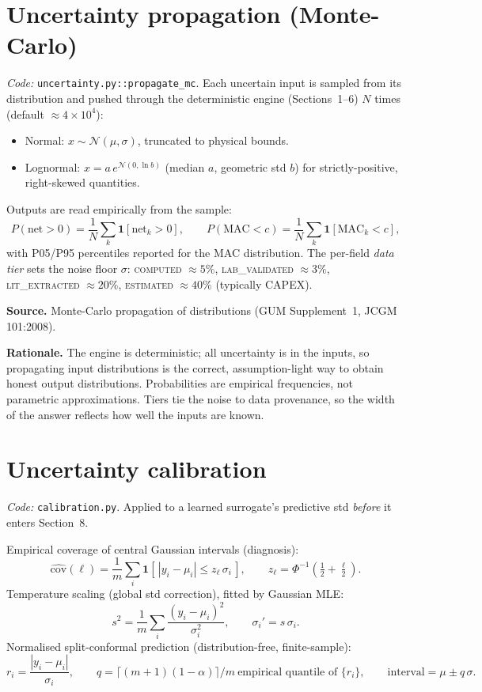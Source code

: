 \documentclass[11pt,a4paper]{article}
\begin{document}
\section{Uncertainty propagation (Monte-Carlo)}
\emph{Code: }\texttt{uncertainty.py::propagate\_mc}. Each uncertain input is
sampled from its distribution and pushed through the deterministic engine
(Sections~1--6) $N$ times (default $\approx 4\times 10^{4}$):
\begin{itemize}[nosep]
  \item Normal: $x\sim\mathcal N(\mu,\sigma)$, truncated to physical bounds.
  \item Lognormal: $x = a\,e^{\mathcal N(0,\ln b)}$ (median $a$, geometric std
  $b$) for strictly-positive, right-skewed quantities.
\end{itemize}
Outputs are read empirically from the sample:
\begin{equation}
P(\text{net}>0) = \frac1N\sum_k \mathbf 1[\text{net}_k>0], \qquad
P(\mathrm{MAC}<c) = \frac1N\sum_k \mathbf 1[\mathrm{MAC}_k<c],
\end{equation}
with P05/P95 percentiles reported for the MAC distribution. The per-field
\emph{data tier} sets the noise floor $\sigma$: \textsc{computed} $\approx 5\%$,
\textsc{lab\_validated} $\approx 3\%$, \textsc{lit\_extracted} $\approx 20\%$,
\textsc{estimated} $\approx 40\%$ (typically CAPEX).

\textbf{Source.} Monte-Carlo propagation of distributions (GUM Supplement~1, JCGM
101:2008).

\textbf{Rationale.} The engine is deterministic; all uncertainty is in the inputs,
so propagating input distributions is the correct, assumption-light way to obtain
honest output distributions. Probabilities are empirical frequencies, not
parametric approximations. Tiers tie the noise to data provenance, so the width of
the answer reflects how well the inputs are known.

\section{Uncertainty calibration}
\emph{Code: }\texttt{calibration.py}. Applied to a learned surrogate's predictive
std \emph{before} it enters Section~8.

Empirical coverage of central Gaussian intervals (diagnosis):
\begin{equation}
\widehat{\mathrm{cov}}(\ell) = \frac1m\sum_i
\mathbf 1\!\left[\,|y_i-\mu_i| \le z_\ell\,\sigma_i\,\right], \qquad
z_\ell = \Phi^{-1}\!\left(\tfrac12 + \tfrac{\ell}{2}\right).
\end{equation}
Temperature scaling (global std correction), fitted by Gaussian MLE:
\begin{equation}
s^2 = \frac1m\sum_i \frac{(y_i-\mu_i)^2}{\sigma_i^2}, \qquad
\sigma_i' = s\,\sigma_i .
\end{equation}
Normalised split-conformal prediction (distribution-free, finite-sample):
\begin{equation}
r_i = \frac{|y_i-\mu_i|}{\sigma_i}, \qquad
q = \big\lceil (m+1)(1-\alpha)\big\rceil / m\ \text{empirical quantile of }\{r_i\}, \qquad
\text{interval} = \mu \pm q\,\sigma .
\end{equation}
\end{document}
